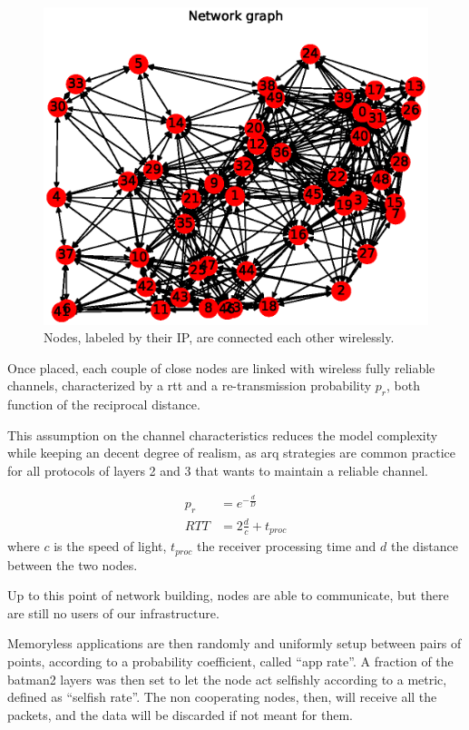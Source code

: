 \documentclass[conference,10.5pt]{IEEEtran}
\begin{document}
\begin{figure}[h]
  \centering
  \includegraphics[width=\linewidth]{figures/example_graph}
  \caption{Nodes, labeled by their IP, are connected each other wirelessly.}
  \label{fig:nodes}
\end{figure}

Once placed, each couple of close nodes are linked with wireless fully reliable channels, characterized by a \gls{rtt} and a re-transmission probability $p_r$, both function of the reciprocal distance.

This assumption on the channel characteristics reduces the model complexity while keeping an decent degree of realism, as \gls{arq} strategies are common practice for all protocols of layers 2 and 3 that wants to maintain a reliable channel.

\begin{equation}
  \begin{split}
    p_r & = e^{-\frac{d}{D}} \\
    RTT &= 2 \frac{d}{c} + t_{proc}
  \end{split}
\end{equation}
where $c$ is the speed of light, $t_{proc}$ the receiver processing time and $d$ the distance between the two nodes.
\smallskip

Up to this point of network building, nodes are able to communicate, but there are still no users of our infrastructure.

Memoryless applications are then randomly and uniformly setup between pairs of points, according to a probability coefficient, called ``app rate''.
A fraction of the \gls{batman2} layers was then set to let the node act selfishly according to a metric, defined as ``selfish rate''. The non cooperating nodes, then, will receive all the packets, and the data will be discarded if not meant for them.
\end{document}
